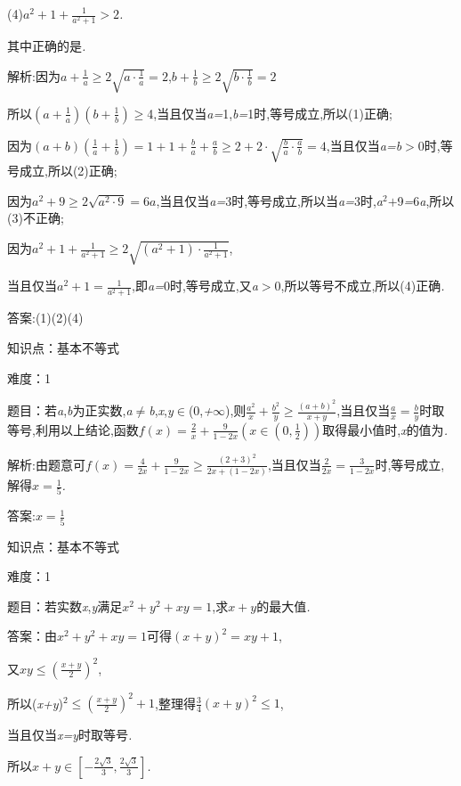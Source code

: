 \documentclass{article} %
\begin{document}
 (4)$a^2+1+\frac{1}{a^2+1}>2$\textit{.}

 其中正确的是\textit{\underbar{　　　　　}.~}

 解析:因为$a+\frac{1}{a}\ge 2\sqrt{a\cdot \frac{1}{a}}=2$,$b+\frac{1}{b}\ge 2\sqrt{b\cdot \frac{1}{b}}=2$

所以$(a+\frac{1}{a})(b+\frac{1}{b})$$\mathrm{\ge}$4,当且仅当\textit{a=}1,\textit{b=}1时,等号成立,所以(1)正确;

因为$(a+b)(\frac{1}{a}+\frac{1}{b})=1+1+\frac{b}{a}+\frac{a}{b} \ge 2+2\cdot \sqrt{\frac{b}{a}\cdot \frac{a}{b}}=4$,当且仅当\textit{a=b$>$}0时,等号成立,所以(2)正确;

因为$a^2+9 \ge 2\sqrt{a^2\cdot9}=6a$,当且仅当\textit{a=}3时,等号成立,所以当\textit{a=}3时,\textit{a}${}^{2}$\textit{$+$}9\textit{=}6\textit{a},所以(3)不正确;

因为$a^2+1+\frac{1}{a^2+1}\ge 2\sqrt{(a^2+1)\cdot\frac{1}{a^2+1}}$,

当且仅当$a^2+1=\frac{1}{a^2+1}$,即\textit{a=}0时,等号成立,又\textit{a$>$}0,所以等号不成立,所以(4)正确\textit{.}

 答案:(1)(2)(4)

知识点：基本不等式

难度：1

 题目：若\textit{a},\textit{b}为正实数,\textit{a}$\mathrm{\neq}$\textit{b},\textit{x},\textit{y}$\mathrm{\in}$(0,\textit{+$\infty$}),则$\frac{a^2}{x}+\frac{b^2}{y}\ge \frac{{(a+b)}^2}{x+y}$,当且仅当$\frac{a}{x}=\frac{b}{y}$时取等号,利用以上结论,函数$f(x)=\frac{2}{x}+\frac{9}{1-2x}(x\in (0,\frac{1}{2}))$取得最小值时,\textit{x}的值为\textit{\underbar{　　　　　}.~}

 解析:由题意可$f(x)=\frac{4}{2x}+\frac{9}{1-2x}\ge \frac{{(2+3)}^2}{2x+(1-2x)}$,当且仅当$\frac{2}{2x}=\frac{3}{1-2x}$时,等号成立,解得$x=\frac{1}{5}$\textit{.}

 答案:$x=\frac{1}{5}$

知识点：基本不等式

难度：1

 题目：若实数\textit{x},\textit{y}满足$x^2+y^2+xy=1$,求\textit{$x+y$}的最大值\textit{.}

 答案：由$x^2+y^2+xy=1$可得${(x+y)}^2=xy+1$,

又$xy \le {(\frac{x+y}{2})}^2$,

所以(\textit{x+y})${}^{2}$$\mathrm{\le}{(\frac{x+y}{2})}^2+1$,整理得$\frac{3}{4}{(x+y)}^2 \le 1$,

当且仅当\textit{x=y}时取等号\textit{.}

所以$x+y \in [-\frac{2\sqrt{3}}{3}, \frac{2\sqrt{3}}{3}]$\textit{.}
\end{document}
